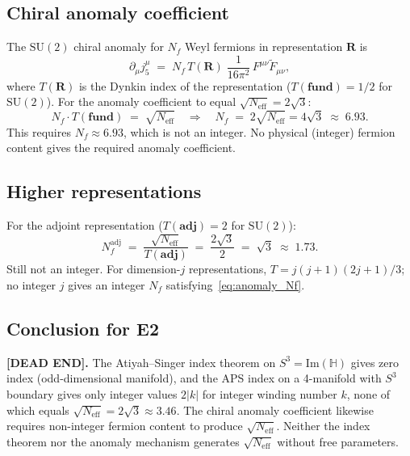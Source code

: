 \documentclass[11pt,a4paper]{article}
\theoremstyle{definition}
\theoremstyle{remark}
\begin{document}
\subsection{Chiral anomaly coefficient}

The $\mathrm{SU}(2)$ chiral anomaly for $N_f$ Weyl fermions in representation
$\mathbf{R}$ is
\begin{equation}
  \partial_\mu j^\mu_5 \;=\; N_f\,T(\mathbf{R})\;\frac{1}{16\pi^2}\,F^{\mu\nu}\tilde{F}_{\mu\nu},
  \label{eq:chiral_anomaly}
\end{equation}
where $T(\mathbf{R})$ is the Dynkin index of the representation
($T(\mathbf{fund}) = 1/2$ for $\mathrm{SU}(2)$).
For the anomaly coefficient to equal $\sqrt{N_{\mathrm{eff}}} = 2\sqrt{3}$:
\begin{equation}
  N_f \cdot T(\mathbf{fund}) \;=\; \sqrt{N_{\mathrm{eff}}}
  \quad\Rightarrow\quad
  N_f \;=\; 2\sqrt{N_{\mathrm{eff}}} = 4\sqrt{3} \;\approx\; 6.93.
  \label{eq:anomaly_Nf}
\end{equation}
This requires $N_f \approx 6.93$, which is not an integer.
No physical (integer) fermion content gives the required anomaly coefficient.

\subsection{Higher representations}

For the adjoint representation ($T(\mathbf{adj}) = 2$ for $\mathrm{SU}(2)$):
\begin{equation}
  N_f^{\mathrm{adj}} \;=\; \frac{\sqrt{N_{\mathrm{eff}}}}{T(\mathbf{adj})}
  \;=\; \frac{2\sqrt{3}}{2} \;=\; \sqrt{3} \;\approx\; 1.73.
\end{equation}
Still not an integer.
For dimension-$j$ representations, $T = j(j+1)(2j+1)/3$; no integer $j$ gives
an integer $N_f$ satisfying~\eqref{eq:anomaly_Nf}.

\subsection{Conclusion for E2}

\textbf{[DEAD END].}
The Atiyah--Singer index theorem on $S^3 = \mathrm{Im}(\mathbb{H})$ gives zero index
(odd-dimensional manifold), and the APS index on a 4-manifold with $S^3$ boundary
gives only integer values $2|k|$ for integer winding number $k$,
none of which equals $\sqrt{N_{\mathrm{eff}}} = 2\sqrt{3} \approx 3.46$.
The chiral anomaly coefficient likewise requires non-integer fermion content
to produce $\sqrt{N_{\mathrm{eff}}}$.
Neither the index theorem nor the anomaly mechanism generates
$\sqrt{N_{\mathrm{eff}}}$ without free parameters.
\end{document}
